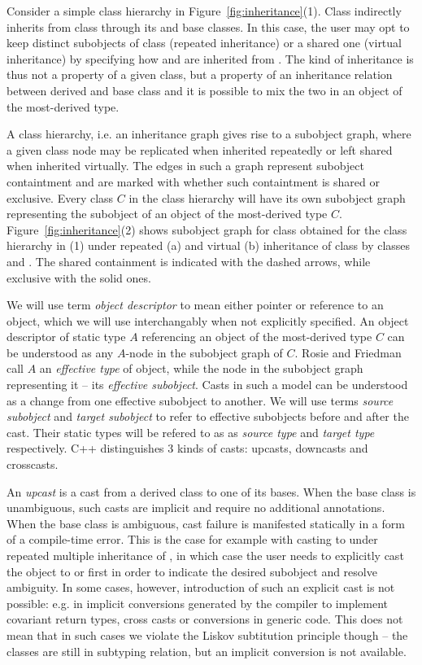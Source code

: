 \noindent
Consider a simple class hierarchy in Figure~\ref{fig:inheritance}(1). Class 
 indirectly inherits from class  through its  and 
 base classes. In this case, the user may opt to keep distinct 
subobjects of class  (repeated inheritance) or a shared one (virtual 
inheritance) by specifying how  and  are inherited from 
. The kind of inheritance is thus not a property of a given class, but a 
property of an inheritance relation between derived and base class and it is 
possible to mix the two in an object of the most-derived type. 

A class hierarchy, i.e. an inheritance graph gives rise to a subobject graph, 
where a given class node may be replicated when inherited repeatedly or left 
shared when inherited virtually. The edges in such a graph represent subobject 
containtment and are marked with whether such containtment is shared or 
exclusive. Every class $C$ in the class hierarchy will have its own subobject 
graph representing the subobject of an object of the most-derived type $C$.
Figure~\ref{fig:inheritance}(2) shows subobject graph for class  
obtained for the class hierarchy in (1) under repeated (a) and virtual (b) 
inheritance of class  by classes  and . The shared 
containment is indicated with the dashed arrows, while exclusive with the solid 
ones.

We will use term \emph{object descriptor} to mean either pointer or reference to 
an object, which we will use interchangably when not explicitly specified. 
An object descriptor of static type $A$ referencing an object of the most-derived 
type $C$ can be understood as any \code{*::}$A$-node in the subobject graph of $C$. Rosie 
and Friedman call $A$ an \emph{effective type} of object, while the node in the 
subobject graph representing it -- its \emph{effective subobject}. 
Casts in such a model can be understood as a change from one effective subobject 
to another. We will use terms \emph{source subobject} and \emph{target 
subobject} to refer to effective subobjects before and after the cast. Their 
static types will be refered to as as \emph{source type} and \emph{target type} 
respectively. C++ distinguishes 3 kinds of casts: upcasts, downcasts and 
crosscasts.

An \emph{upcast} is a cast from a derived class to one of its bases. When the 
base class is unambiguous, such casts are implicit and require no additional 
annotations. When the base class is ambiguous, cast failure is manifested 
statically in a form of a compile-time error. This is the case for example with 
casting  to  under repeated multiple inheritance of , 
in which case the user needs to explicitly cast the object to  or 
 first in order to indicate the desired subobject and resolve ambiguity. 
In some cases, however, introduction of such an explicit cast is not possible: 
e.g. in implicit conversions generated by the compiler to implement covariant 
return types, cross casts or conversions in generic code. This does not mean 
that in such cases we violate the Liskov subtitution principle though -- the 
classes are still in subtyping relation, but an implicit conversion is not 
available.

